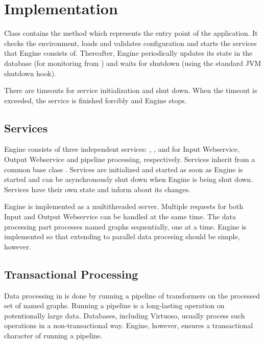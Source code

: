 \section{Implementation}
Class  contains the  method which represents the entry point of the application. It checks the environment, loads and validates configuration and starts the services that Engine consists of. Thereafter, Engine periodically updates its state in the database (for monitoring from \FE) and waits for shutdown (using the standard JVM shutdown hook).

There are timeouts for service initialization and shut down. When the timeout is exceeded, the service is finished forcibly and Engine stops.

\subsection{Services}
Engine consists of three independent services: 
, , and  for Input Webservice, Output Webservice and pipeline processing, respectively. Services inherit from a common base class . Services are initialized and started as soon as Engine is started and can be asynchronously shut down when Engine is being shut down. Services have their own state and inform  about its changes. 

Engine is implemented as a multithreaded server. Multiple requests for both Input and Output Webservice can be handled at the same time. The data processing part processes named graphs sequentially, one at a time. Engine is implemented so that extending to parallel data procesing should be simple, however. 

\subsection{Transactional Processing}
\label{sec:transactionalProcessing}
Data processing in \odcs is done by running a pipeline of transformers on the processed set of named graphs. Running a pipeline is a long-lasting operation on potentionally large data. Databases, including Virtuoso, usually process such operations in a non-transactional way. Engine, however, ensures a transactional character of running a pipeline. 

